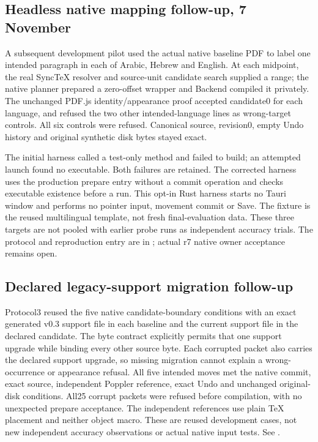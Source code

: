 \subsection{Headless native mapping follow-up, 7 November}
A subsequent development pilot used the actual native baseline PDF to label
one intended paragraph in each of Arabic, Hebrew and English. At each midpoint,
the real SyncTeX resolver and source-unit candidate search supplied a range;
the native planner prepared a zero-offset wrapper and Backend compiled it
privately. The unchanged PDF.js identity/appearance proof accepted candidate0
for each language, and refused the two other intended-language lines as
wrong-target controls. All six controls were refused. Canonical source,
revision0, empty Undo history and original synthetic disk bytes stayed exact.

The initial harness called a test-only method and failed to build; an attempted
launch found no executable. Both failures are retained. The corrected harness
uses the production prepare entry without a commit operation and checks
executable existence before a run. This opt-in Rust harness starts no Tauri
window and performs no pointer input, movement commit or Save. The fixture is
the reused multilingual template, not fresh final-evaluation data. These three
targets are not pooled with earlier probe runs as independent accuracy trials.
The protocol and reproduction entry are in
; actual r7 native owner acceptance remains open.

\subsection{Declared legacy-support migration follow-up}
Protocol3 reused the five native candidate-boundary conditions with an exact
generated v0.3 support file in each baseline and the current support file in
the declared candidate. The byte contract explicitly permits that one support
upgrade while binding every other source byte. Each corrupted packet also
carries the declared support upgrade, so missing migration cannot explain a
wrong-occurrence or appearance refusal. All five intended moves met the native
commit, exact source, independent Poppler reference, exact Undo and unchanged
original-disk conditions. All25 corrupt packets were refused before compilation,
with no unexpected prepare acceptance. The independent references use plain
TeX placement and neither object macro. These are reused development cases,
not new independent accuracy observations or actual native input tests. See
.

